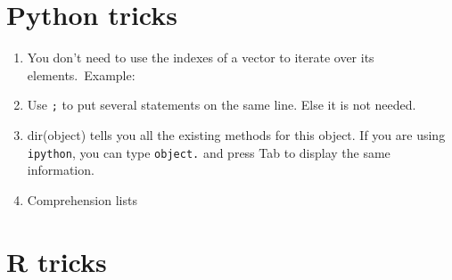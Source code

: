 \documentclass[a4paper,11pt]{article}
\begin{document}
\newpage

\section{Python tricks}
\begin{enumerate}
\item You don't need to use the indexes of a vector to iterate over its elements.\
Example:
\item Use \texttt{;} to put several statements on the same line. Else it is not needed.
\item dir(object) tells you all the existing methods for this object. If you are using
\texttt{ipython}, you can type \texttt{object.} and press Tab to display the same information.
\item Comprehension lists
\end{enumerate}

\section{R tricks}
\end{document}
